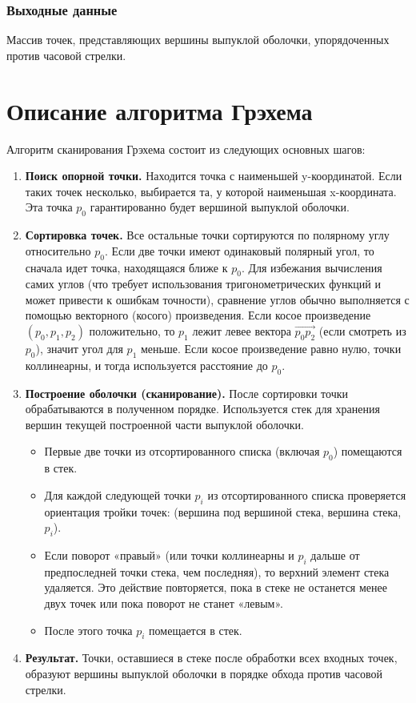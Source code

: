\documentclass[12pt]{article}
\begin{document}
\subsubsection{Выходные данные}
Массив точек, представляющих вершины выпуклой оболочки, упорядоченных против часовой стрелки.

\newpage
\section{Описание алгоритма Грэхема}
Алгоритм сканирования Грэхема состоит из следующих основных шагов:

\begin{enumerate}
    \item \textbf{Поиск опорной точки.} Находится точка с наименьшей y-координатой. Если таких точек несколько, выбирается та, у которой наименьшая x-координата. Эта точка $p_0$ гарантированно будет вершиной выпуклой оболочки.
    \item \textbf{Сортировка точек.} Все остальные точки сортируются по полярному углу относительно $p_0$. Если две точки имеют одинаковый полярный угол, то сначала идет точка, находящаяся ближе к $p_0$. Для избежания вычисления самих углов (что требует использования тригонометрических функций и может привести к ошибкам точности), сравнение углов обычно выполняется с помощью векторного (косого) произведения. Если косое произведение $(p_0, p_1, p_2)$ положительно, то $p_1$ лежит левее вектора $\vec{p_0 p_2}$ (если смотреть из $p_0$), значит угол для $p_1$ меньше. Если косое произведение равно нулю, точки коллинеарны, и тогда используется расстояние до $p_0$.
    \item \textbf{Построение оболочки (сканирование).} После сортировки точки обрабатываются в полученном порядке. Используется стек для хранения вершин текущей построенной части выпуклой оболочки. 
    \begin{itemize}
        \item Первые две точки из отсортированного списка (включая $p_0$) помещаются в стек.
        \item Для каждой следующей точки $p_i$ из отсортированного списка проверяется ориентация тройки точек: (вершина под вершиной стека, вершина стека, $p_i$).
        \item Если поворот «правый» (или точки коллинеарны и $p_i$ дальше от предпоследней точки стека, чем последняя), то верхний элемент стека удаляется. Это действие повторяется, пока в стеке не останется менее двух точек или пока поворот не станет «левым».
        \item После этого точка $p_i$ помещается в стек.
    \end{itemize}
    \item \textbf{Результат.} Точки, оставшиеся в стеке после обработки всех входных точек, образуют вершины выпуклой оболочки в порядке обхода против часовой стрелки.
\end{enumerate}
\end{document}
